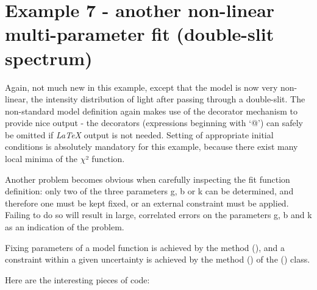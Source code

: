 \documentclass[a4paper,10pt,english]{sphinxmanual}
\begin{document}
\section{Example 7 - another non-linear multi-parameter fit (double-slit spectrum)}
\label{index:example-7-another-non-linear-multi-parameter-fit-double-slit-spectrum}
Again, not much new in this example, except that the
model is now very non-linear, the intensity distribution
of light after passing through a double-slit. The
non-standard model definition again makes use of the
decorator mechanism to provide nice output - the decorators
(expressions beginning with `@') can safely be omitted if \emph{LaTeX}
output is not needed. Setting of appropriate initial
conditions is absolutely mandatory for this example,
because there  exist many local minima of the \(\chi\)² function.

Another problem becomes obvious when carefully inspecting
the fit function definition: only two of the three parameters g,
b or k can be determined, and therefore one must be kept fixed,
or an external constraint must be applied.
Failing to do so will result in large, correlated errors
on the parameters g, b and k as an indication of the problem.

Fixing parameters of a model function is achieved by the method
{\hyperref[index:kafe.fit.Fit.fix_parameters]{\emph{}}} (), and a constraint within a given uncertainty
is achieved by the method {\hyperref[index:kafe.fit.Fit.constrain_parameters]{\emph{}}} ()
of the {\hyperref[index:kafe.fit.Fit]{\emph{}}} () class.

Here are the interesting pieces of code:
\end{document}
